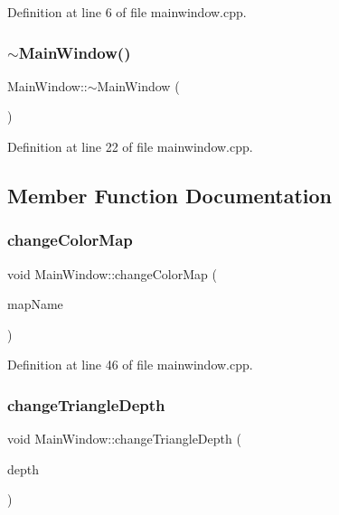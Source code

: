 Definition at line 6 of file mainwindow.\+cpp.

\mbox{\label{class_main_window_ae98d00a93bc118200eeef9f9bba1dba7}} 
\subsubsection{\texorpdfstring{$\sim$\+Main\+Window()}{~MainWindow()}}
{\footnotesize\ttfamily Main\+Window\+::$\sim$\+Main\+Window (\begin{DoxyParamCaption}{ }\end{DoxyParamCaption})}



Definition at line 22 of file mainwindow.\+cpp.



\subsection{Member Function Documentation}
\mbox{\label{class_main_window_a1cfcf14a3dbba8db45a2444a0fbe5a9f}} 
\subsubsection{\texorpdfstring{change\+Color\+Map}{changeColorMap}}
{\footnotesize\ttfamily void Main\+Window\+::change\+Color\+Map (\begin{DoxyParamCaption}\item[{Q\+String}]{map\+Name }\end{DoxyParamCaption})\hspace{0.3cm}{\ttfamily [slot]}}



Definition at line 46 of file mainwindow.\+cpp.

\mbox{\label{class_main_window_a7bdf36376a7474c5218923ed66baa937}} 
\subsubsection{\texorpdfstring{change\+Triangle\+Depth}{changeTriangleDepth}}
{\footnotesize\ttfamily void Main\+Window\+::change\+Triangle\+Depth (\begin{DoxyParamCaption}\item[{int}]{depth }\end{DoxyParamCaption})\hspace{0.3cm}{\ttfamily [slot]}}



